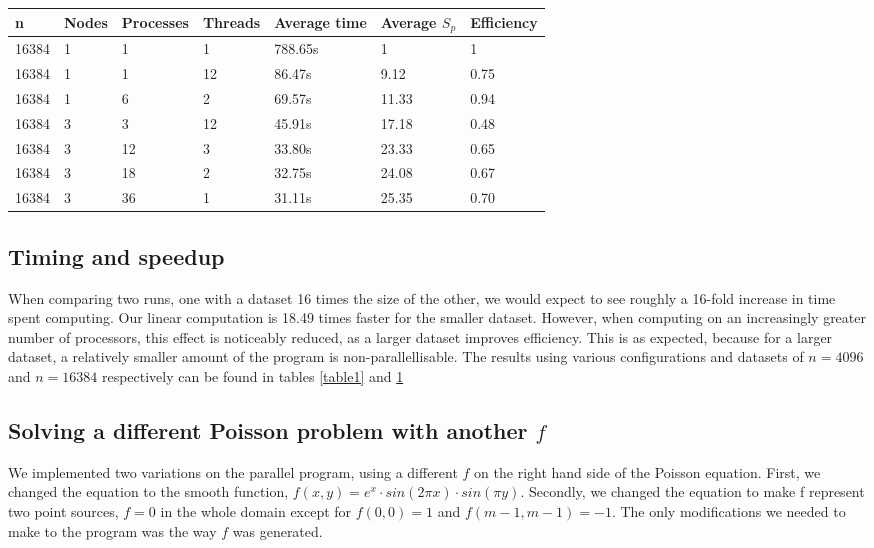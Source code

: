 \begin{table}[h]
   \centering
    \begin{tabular}{| l | l | l | l | l | l | l |}
    \hline
    \bf{n} & \bf{Nodes} & \bf{Processes} &\bf{Threads} & \bf{Average time} & \bf{Average }$S_{p}$ & \bf{Efficiency} \\ \hline
    	16384 & 1 & 1 & 1 & 788.65s & 1 & 1 \\ \hline
	16384 & 1 & 1 & 12 & 86.47s & 9.12 & 0.75 \\ \hline
	16384 & 1 & 6 & 2 & 69.57s & 11.33 & 0.94 \\ \hline
	16384 & 3 & 3 & 12 & 45.91s & 17.18 & 0.48 \\ \hline
	16384 & 3 & 12 & 3 & 33.80s & 23.33 & 0.65 \\ \hline
	16384 & 3 & 18 & 2 & 32.75s & 24.08 & 0.67 \\ \hline	
	16384 & 3 & 36 & 1 & 31.11s & 25.35 & 0.70  \\ \hline
    \end{tabular}
	\label{table2}
\end{table}



\subsection{Timing and speedup}
When comparing two runs, one with a dataset 16 times the size of the other, we would expect to see roughly a 16-fold increase in time spent computing. Our linear computation is 18.49 times faster for the smaller dataset. However, when computing on an increasingly greater number of processors, this effect is noticeably reduced, as a larger dataset improves efficiency. This is as expected, because for a larger dataset, a relatively smaller amount of the program is non-parallellisable. The results using various configurations and datasets of $n = 4096$ and $n = 16384$ respectively can be found in tables \ref{table1} and \ref{table2}

\subsection{Solving a different Poisson problem with another $f$}
We implemented two variations on the parallel program, using a different $f$ on the right hand side of the Poisson equation. First, we changed the equation to the smooth function, $f(x, y) = e^x \cdot sin ( 2 \pi x) \cdot sin (\pi y)$. Secondly, we changed the equation to make f represent two point sources, $f = 0$ in the whole domain except for $f(0, 0) = 1$ and $f(m-1, m-1) = -1$. The only modifications we needed to make to the program was the way $f$ was generated.